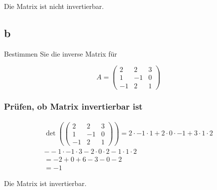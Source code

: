 Die Matrix ist nicht invertierbar.

\subsection{b}
Bestimmen Sie die inverse Matrix für

\[
A = \begin{pmatrix}
    2 & 2 & 3 \\ 1 & -1 & 0 \\ -1 & 2 & 1
\end{pmatrix}
\]

\subsubsection*{Prüfen, ob Matrix invertierbar ist}

\begin{align*}
    \det\left(
        \begin{pmatrix}
            2 & 2 & 3 \\
            1 & -1  & 0 \\
            -1 & 2 & 1
        \end{pmatrix}
    \right) = 2 \cdot -1 \cdot 1 + 2 \cdot 0 \cdot -1 + 3 \cdot 1 \cdot 2 \\
    - -1 \cdot -1 \cdot 3 - 2 \cdot 0 \cdot 2 - 1 \cdot 1 \cdot 2\\
    =-2 + 0 + 6 - 3 - 0 - 2 \\
    = -1
\end{align*}

Die Matrix ist invertierbar.

